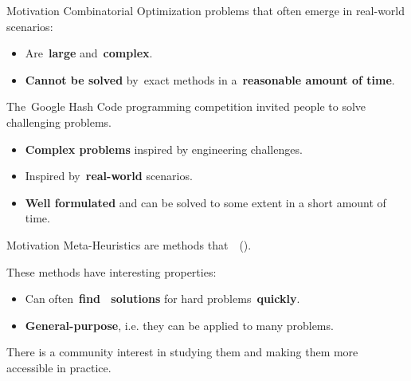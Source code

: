\begin{frame}{Motivation}
  Combinatorial Optimization problems that often emerge in real-world scenarios:
  \begin{itemize}
    \item Are~\textbf{large} and~\textbf{complex}.
    \item \textbf{Cannot be solved} by~\alert{exact} methods in a~\textbf{reasonable amount of time}.
  \end{itemize}

  The~\alert{Google Hash Code} programming competition invited people
  to solve challenging problems.

  \begin{itemize}
    \item \textbf{Complex problems} inspired by engineering challenges.
    \item Inspired by~\textbf{real-world} scenarios.
    \item \textbf{Well formulated} and can be solved to some extent in a short amount of time.
  \end{itemize}
\end{frame}

\begin{frame}{Motivation}
  \alert{Meta-Heuristics} are methods that~~(\cite{osman1996metaheuristics}).

  These methods have interesting properties:
  \begin{itemize}
    \item Can often~\textbf{find~ solutions} for hard problems~\textbf{quickly}.
    \item \textbf{General-purpose}, i.e. they can be applied to many problems.
  \end{itemize}

  There is a community interest in studying them and making them more accessible in practice.
\end{frame}

